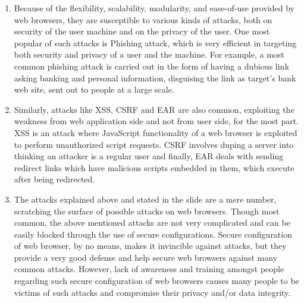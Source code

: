 \documentclass[12pt]{extarticle}
\begin{document}
	\begin{enumerate}
	
	\item Because of the flexibility, scalability, modularity, and ease-of-use provided by web browsers, they are susceptible to various kinds of attacks, both on security of the user machine and on the privacy of the user. One most popular of such attacks is Phishing attack, which is very efficient in targeting both security and privacy of a user and the machine. For example, a most common phishing attack is carried out in the form of having a dubious link asking banking and personal information, disguising the link as target's bank web site, sent out to people at a large scale. 
	
	
	\item Similarly, attacks like XSS, CSRF and EAR are also common, exploiting the weakness from web application side and not from user side, for the most part. XSS is an attack where JavaScript functionality of a web browser is exploited to perform unauthorized script requests. CSRF involves duping a server into thinking an attacker is a regular user and finally, EAR deals with sending redirect links which have malicious scripts embedded in them, which execute after being redirected.
	
	
	\item The attacks explained above and stated in the slide are a mere number, scratching the surface of possible attacks on web browsers. Though most common, the above mentioned attacks are not very complicated and can be easily blocked through the use of secure configurations. Secure configuration of web browser, by no means, makes it invincible against attacks, but they provide a very good defense and help secure web browsers against many common attacks. However, lack of awareness and training amongst people regarding such secure configuration of web browsers causes many people to be victims of such attacks and compromise their privacy and/or data integrity.
	\end{enumerate}
	
	
\end{document}
